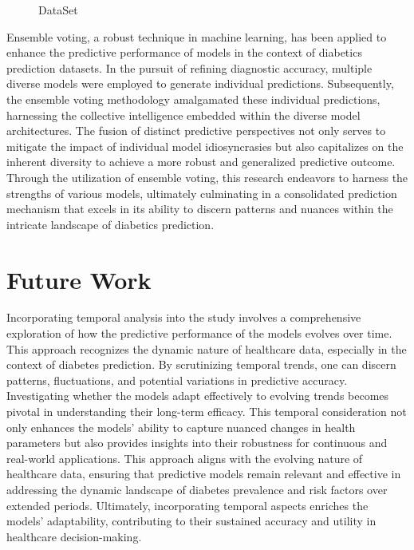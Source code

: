 \documentclass[11pt]{article}
\begin{document}
\begin{figure}[h]
\begin{center}
\end{center}
\caption{DataSet}
\label{experiment1fitness}
\end{figure}


Ensemble voting, a robust technique in machine learning, has been applied to enhance the predictive performance of models in the context of diabetics prediction datasets. In the pursuit of refining diagnostic accuracy, multiple diverse models were employed to generate individual predictions. Subsequently, the ensemble voting methodology amalgamated these individual predictions, harnessing the collective intelligence embedded within the diverse model architectures. The fusion of distinct predictive perspectives not only serves to mitigate the impact of individual model idiosyncrasies but also capitalizes on the inherent diversity to achieve a more robust and generalized predictive outcome. Through the utilization of ensemble voting, this research endeavors to harness the strengths of various models, ultimately culminating in a consolidated prediction mechanism that excels in its ability to discern patterns and nuances within the intricate landscape of diabetics prediction. 



\section{Future Work}

Incorporating temporal analysis into the study involves a comprehensive exploration of how the predictive performance of the models evolves over time. This approach recognizes the dynamic nature of healthcare data, especially in the context of diabetes prediction. By scrutinizing temporal trends, one can discern patterns, fluctuations, and potential variations in predictive accuracy. Investigating whether the models adapt effectively to evolving trends becomes pivotal in understanding their long-term efficacy. This temporal consideration not only enhances the models' ability to capture nuanced changes in health parameters but also provides insights into their robustness for continuous and real-world applications. This approach aligns with the evolving nature of healthcare data, ensuring that predictive models remain relevant and effective in addressing the dynamic landscape of diabetes prevalence and risk factors over extended periods. Ultimately, incorporating temporal aspects enriches the models' adaptability, contributing to their sustained accuracy and utility in healthcare decision-making.
\end{document}
